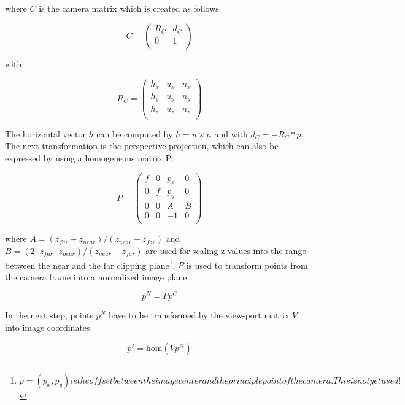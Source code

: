where $C$ is the camera matrix which is created as follows

\begin{equation}
C = \left(\begin{array}{cc}
  R_C & d_C\\
  0 & 1\\
  \end{array}\right)
\end{equation}


with

\begin{equation}
R_C = \left(\begin{array}{ccc}
  h_x & u_x & n_x \\
  h_y & u_y & n_y \\
  h_z & u_z & n_z \\
  \end{array}\right)
\end{equation}

The horizontal vector $h$ can be computed by $h=u\times{}n$ and with $d_C=-R_C*p$.\\
The next transformation is the perspective projection, which can also be expressed by using a homogeneous matrix P:

\begin{equation}
P = \left(\begin{array}{cccc}
  f & 0 & p_x & 0\\
  0 & f & p_y & 0\\
  0 & 0 & A & B\\
  0 & 0 & -1 & 0\\
  \end{array}\right)
\end{equation}

where $A=(z_{far}+z_{near})/(z_{near}-z_{far})$ and $B = (2 \cdot{}z_{far} \cdot{}z_{near})/(z_{near}-z_{far})$ are used for scaling z values into the
range between the near and the far clipping plane\footnote{$p=(p_x,p_y) is the offset between the image center and the principle point of the camera. This is not yet used!$}. $P$ is used to transform points from the camera frame into a normalized image plane:

\begin{equation}
p^N = P p^C
\end{equation}

In the next step, points $p^N$ have to be transformed by the view-port matrix $V$ into image coordinates.

\begin{equation}
p^I = \mbox{hom}(V p^N)
\end{equation}

